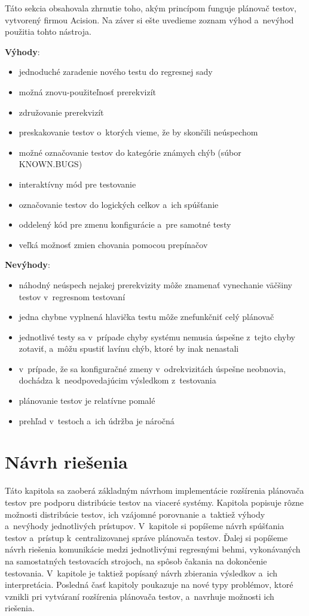 Táto sekcia obsahovala zhrnutie toho, akým princípom funguje plánovač 
testov, vytvorený firmou Acision. Na záver si ešte uvedieme zoznam 
výhod a~nevýhod použitia tohto nástroja.

\noindent \textbf{Výhody}:
\begin{itemize}
\item jednoduché zaradenie nového testu do regresnej sady
\item možná znovu-použiteľnosť prerekvizít
\item združovanie prerekvizít
\item preskakovanie testov o~ktorých vieme, že by skončili neúspechom
\item možné označovanie testov do kategórie známych chýb (súbor KNOWN.BUGS)
\item interaktívny mód pre testovanie
\item označovanie testov do logických celkov a~ich spúšťanie
\item oddelený kód pre zmenu konfigurácie a~pre samotné testy
\item veľká možnosť zmien chovania pomocou prepínačov
\end{itemize} 

\noindent \textbf{Nevýhody}:
\begin{itemize}
\item náhodný neúspech nejakej prerekvizity môže znamenať vynechanie 
väčšiny testov v~regresnom testovaní
\item jedna chybne vyplnená hlavička testu môže znefunkčniť celý plánovač
\item jednotlivé testy sa v~prípade chyby systému nemusia úspešne z~tejto 
chyby zotaviť, a~môžu spustiť lavínu chýb, ktoré by inak nenastali 
\item v~prípade, že sa konfiguračné zmeny v~odrekvizitách úspešne neobnovia, 
dochádza k~neodpovedajúcim výsledkom z~testovania
\item plánovanie testov je relatívne pomalé
\item prehľad v~testoch a~ich údržba je náročná
\end{itemize}



%
%
\chapter{Návrh riešenia}
\label{kapitola:navrh_riesenia}
Táto kapitola sa zaoberá základným návrhom implementácie rozšírenia 
plánovača testov pre podporu distribúcie testov na viaceré systémy. 
Kapitola popisuje rôzne možnosti distribúcie testov, ich vzájomné 
porovnanie a~taktiež výhody a~nevýhody jednotlivých prístupov. 
V~kapitole si popíšeme návrh spúšťania testov a~prístup k~centralizovanej 
správe plánovača testov. Ďalej si popíšeme návrh riešenia komunikácie 
medzi jednotlivými regresnými behmi, vykonávaných na samostatných 
testovacích strojoch, na spôsob čakania na dokončenie testovania. 
V~kapitole je taktiež popísaný návrh zbierania výsledkov a~ich interpretácia.
Posledná časť kapitoly poukazuje na nové typy problémov, ktoré vznikli pri
vytváraní rozšírenia plánovača testov, a~navrhuje možnosti ich riešenia.



